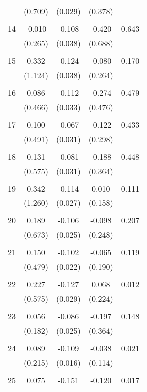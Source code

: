 \begin{tabular}{l*{1}{cccc}}
          & (0.709) & (0.029) & (0.378) & \\
 & & & &\\
  14       & -0.010 & -0.108 & -0.420 & 0.643 \\
          & (0.265) & (0.038) & (0.688) & \\
 & & & &\\
  15       & 0.332 & -0.124 & -0.080 & 0.170 \\
          & (1.124) & (0.038) & (0.264) & \\
 & & & &\\
  16       & 0.086 & -0.112 & -0.274 & 0.479 \\
          & (0.466) & (0.033) & (0.476) & \\
 & & & &\\
  17       & 0.100 & -0.067 & -0.122 & 0.433 \\
          & (0.491) & (0.031) & (0.298) & \\
 & & & &\\
  18       & 0.131 & -0.081 & -0.188 & 0.448 \\
          & (0.575) & (0.031) & (0.364) & \\
 & & & &\\
  19       & 0.342 & -0.114 & 0.010 & 0.111 \\
          & (1.260) & (0.027) & (0.158) & \\
 & & & &\\
  20       & 0.189 & -0.106 & -0.098 & 0.207 \\
          & (0.673) & (0.025) & (0.248) & \\
 & & & &\\
  21       & 0.150 & -0.102 & -0.065 & 0.119 \\
          & (0.479) & (0.022) & (0.190) & \\
 & & & &\\
  22       & 0.227 & -0.127 & 0.068 & 0.012 \\
          & (0.575) & (0.029) & (0.224) & \\
 & & & &\\
  23       & 0.056 & -0.086 & -0.197 & 0.148 \\
          & (0.182) & (0.025) & (0.364) & \\
 & & & &\\
  24       & 0.089 & -0.109 & -0.038 & 0.021 \\
          & (0.215) & (0.016) & (0.114) & \\
 & & & &\\
  25       & 0.075 & -0.151 & -0.120 & 0.017 \\

\end{tabular}
